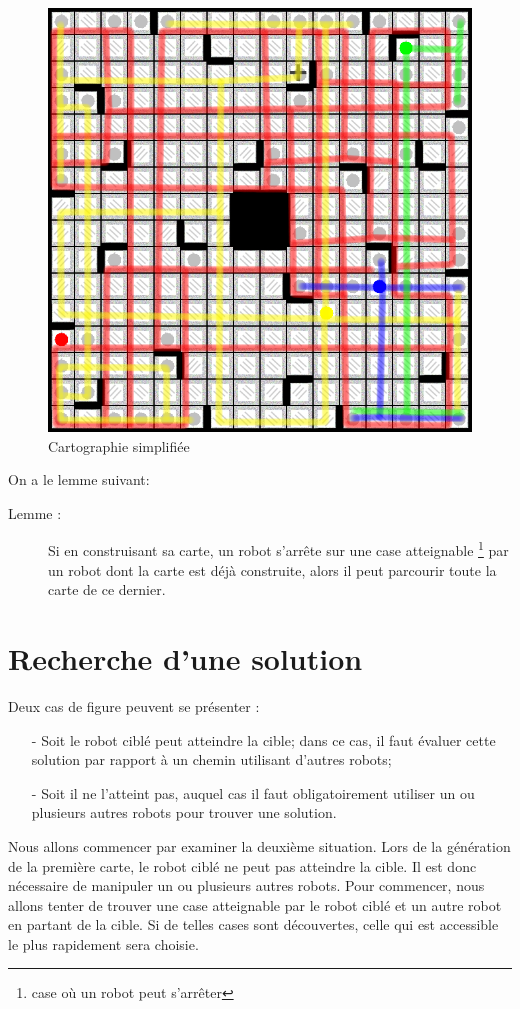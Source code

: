 \documentclass[a4paper,11pt]{article}
\begin{document}
\begin{figure}[htbp]
    \centering
    \includegraphics[width=.7\linewidth]{img/chemins_initiaux.png}
    \caption{Cartographie simplifi\'ee}
    \label{fig:itineraire}
  \end{figure}

On a le lemme suivant:\\
\begin{description}
  \item[Lemme : ] Si en construisant sa carte, un robot s'arrête sur une case atteignable \footnote{case où un robot peut s'arrêter} par un robot dont la carte est d\'ej\`a construite, alors il peut parcourir toute la carte de ce dernier.
\end{description}

\section{Recherche d'une solution}
Deux cas de figure peuvent se pr\'esenter :
\begin{itemize}
  \item[-] Soit le robot cibl\'e peut atteindre la cible; dans ce cas, il faut \'evaluer cette solution par rapport \`a un chemin utilisant d'autres robots;
  \item[-] Soit il ne l'atteint pas, auquel cas il faut obligatoirement utiliser un ou plusieurs autres robots pour trouver une solution.
\end{itemize}

Nous allons commencer par examiner la deuxi\`eme situation. Lors de la g\'en\'eration de la premi\`ere carte, le robot cibl\'e ne peut pas atteindre la cible. Il est donc n\'ecessaire de manipuler un ou plusieurs autres robots. Pour commencer, nous allons tenter de trouver une case atteignable par le robot cibl\'e et un autre robot en partant de la cible. Si de telles cases sont d\'ecouvertes, celle qui est accessible le plus rapidement sera choisie.
\end{document}
